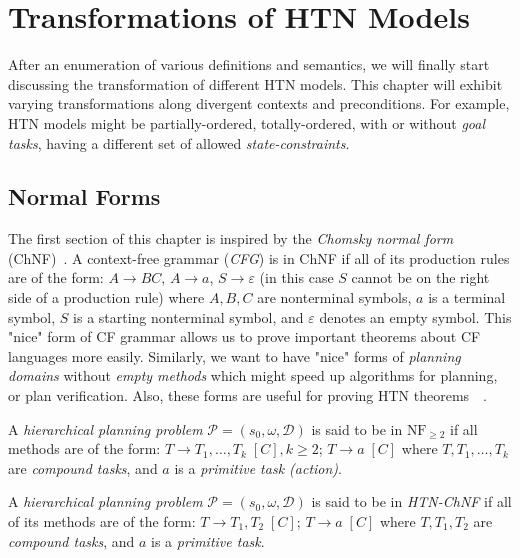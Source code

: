 \chapter{Transformations of {HTN} {M}odels}

\medskip\noindent
After an enumeration of various definitions and semantics, we will finally start discussing the transformation of different HTN models. This chapter will exhibit varying transformations along divergent contexts and preconditions. For example, HTN models might be partially-ordered, totally-ordered, with or without \emph{goal tasks}, having a different set of allowed \emph{state-constraints}.

\section{Normal Forms}

\medskip\noindent
The first section of this chapter is inspired by the \emph{Chomsky normal form} (ChNF)~\cite{chytil}. A context-free grammar (\emph{CFG}) is in ChNF if all of its production rules are of the form: $A \rightarrow BC$, $A \rightarrow a$, $S \rightarrow \varepsilon$ (in this case $S$ cannot be on the right side of a production rule) where $A, B, C$ are nonterminal symbols, $a$ is a terminal symbol, $S$ is a starting nonterminal symbol, and $\varepsilon$ denotes an empty symbol. This "nice" form of CF grammar allows us to prove important theorems about CF languages more easily. Similarly, we want to have "nice" forms of \emph{planning domains} without \emph{empty methods} which might speed up algorithms for planning, or plan verification. Also, these forms are useful for proving HTN theorems~\cite{langclassification}~\cite{cmyk}.

\begin{defn}\label{def04:14} \cite{langclassification}
    A \emph{hierarchical planning problem} $\mathcal{P} = (s_0,\omega,\mathcal{D})$ is said to be in $\text{NF}_{\geq 2}$ if all methods are of the form: $T \rightarrow T_1, \dots, T_k \; [C], k \geq 2$; $T \rightarrow a \; [C]$ where $T, T_1, \dots, T_k$ are \emph{compound tasks}, and $a$ is a \emph{primitive task (action)}.
\end{defn}

\begin{defn}\label{def04:15}
    A \emph{hierarchical planning problem} $\mathcal{P} = (s_0,\omega,\mathcal{D})$ is said to be in \emph{HTN-ChNF} if all of its methods are of the form: $T \rightarrow T_1, T_2 \; [C]$; $T \rightarrow a \; [C]$ where $T, T_1, T_2$ are \emph{compound tasks}, and $a$ is a \emph{primitive task}. 
\end{defn}

